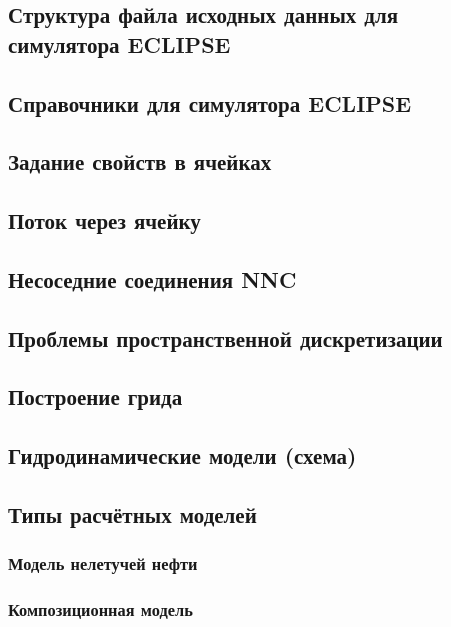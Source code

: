 \documentclass[main.tex]{subfiles}
\begin{document}
\subsection{Структура файла исходных данных для симулятора ECLIPSE}

\subsection{Справочники для симулятора ECLIPSE}

\subsection{Задание свойств в ячейках}

\subsection{Поток через ячейку}

\subsection{Несоседние соединения NNC}

\subsection{Проблемы пространственной дискретизации}

\subsection{Построение грида}

\subsection{Гидродинамические модели (схема)}

\subsection{Типы расчётных моделей}

\subsubsection{Модель нелетучей нефти}

\subsubsection{Композиционная модель}
\end{document}
